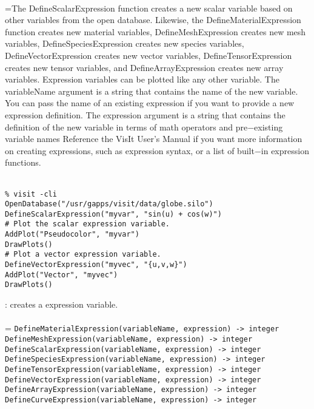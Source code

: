 \documentclass[10pt,a4paper]{report}
\begin{document}
 \\ 
\hangindent=\parindent The DefineScalarExpression function creates a new scalar variable based on other variables from the open database. Likewise, the DefineMaterialExpression function creates new material variables, DefineMeshExpression creates new mesh variables, DefineSpeciesExpression creates new species variables, DefineVectorExpression creates new vector variables, DefineTensorExpression creates new tensor variables, and DefineArrayExpression creates new array variables. Expression variables can be plotted like any other variable. The variableName argument is a string that contains the name of the new variable. You can pass the name of an existing expression if you want to provide a new expression definition. The expression argument is a string that contains the definition of the new variable in terms of math operators and pre$-$existing variable names Reference the VisIt User's Manual if you want more information on  creating expressions, such as expression syntax, or a list of built$-$in expression functions. \\[-3mm] 

\\[-6mm]
\begin{verbatim}% visit -cli
OpenDatabase("/usr/gapps/visit/data/globe.silo")
DefineScalarExpression("myvar", "sin(u) + cos(w)")
# Plot the scalar expression variable.
AddPlot("Pseudocolor", "myvar")
DrawPlots()
# Plot a vector expression variable.
DefineVectorExpression("myvec", "{u,v,w}")
AddPlot("Vector", "myvec")
DrawPlots()
\end{verbatim}
\newpage


{}
: creates a expression variable.\\[-3mm]

 \\ 
\hangindent=\parindent 
\verb!DefineMaterialExpression(variableName, expression) -> integer!\\ 
\verb!DefineMeshExpression(variableName, expression) -> integer!\\ 
\verb!DefineScalarExpression(variableName, expression) -> integer!\\ 
\verb!DefineSpeciesExpression(variableName, expression) -> integer!\\ 
\verb!DefineTensorExpression(variableName, expression) -> integer!\\ 
\verb!DefineVectorExpression(variableName, expression) -> integer!\\ 
\verb!DefineArrayExpression(variableName, expression) -> integer!\\ 
\verb!DefineCurveExpression(variableName, expression) -> integer!\\ [-3mm]
\end{document}
